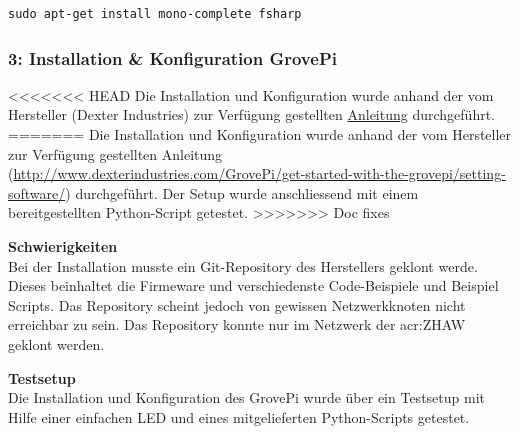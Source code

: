 \begin{lstlisting}
sudo apt-get install mono-complete fsharp
\end{lstlisting}


\subsubsection{3: Installation \& Konfiguration GrovePi}
<<<<<<< HEAD
Die Installation und Konfiguration wurde anhand der vom Hersteller (Dexter Industries) zur Verfügung gestellten \hyperlink{ http://www.dexterindustries.com/GrovePi/get-started-with-the-grovepi/setting-software/}{Anleitung} durchgeführt.
=======
Die Installation und Konfiguration wurde anhand der vom Hersteller zur Verfügung gestellten Anleitung (\url{http://www.dexterindustries.com/GrovePi/get-started-with-the-grovepi/setting-software/}) durchgeführt. Der Setup wurde anschliessend mit einem bereitgestellten Python-Script getestet.
>>>>>>> Doc fixes

\textbf{Schwierigkeiten}\\
Bei der Installation musste ein Git-Repository des Herstellers geklont werde. Dieses beinhaltet die Firmeware und verschiedenste Code-Beispiele und Beispiel Scripts. Das Repository scheint jedoch von gewissen Netzwerkknoten nicht erreichbar zu sein. Das Repository konnte nur im Netzwerk der \gls{acr:ZHAW} geklont werden.

\textbf{Testsetup}\\
Die Installation und Konfiguration des GrovePi wurde über ein Testsetup mit Hilfe einer einfachen LED und eines mitgelieferten Python-Scripts getestet.


